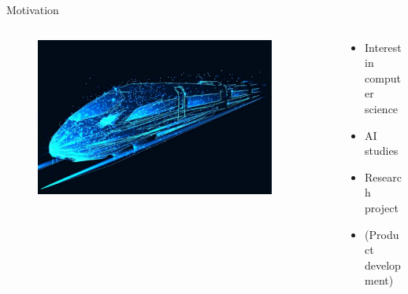\documentclass[aspectratio=169]{beamer}
\begin{document}
\begin{frame}{Motivation}
    \begin{columns}[T]
        \begin{column}{0.3\textwidth}
            \begin{figure}[H]
                \raggedleft
                \includegraphics[width=0.9\textwidth]{./tex_images/digital_train.png}
            \end{figure}
        \end{column}
        \begin{column}{0.65\textwidth}
            \vspace*{0.5cm}
            \begin{itemize}
                \item Interest in computer science
                \item AI studies
                \item <3-> \alert{Research project}
                \item <4-> \alert{(Product development)}
            \end{itemize}
        \end{column}
    \end{columns}
\end{frame}
\end{document}
